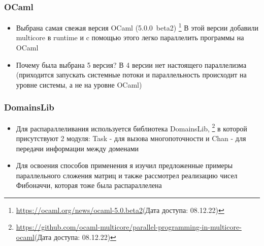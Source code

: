 \documentclass{beamer}
\begin{document}

\begin{frame}
  \frametitle{OCaml}
  \begin{itemize}
  \item Выбрана самая свежая версия OCaml (5.0.0~beta2)
  \footnote{\url{https://ocaml.org/news/ocaml-5.0.beta2}(Дата доступа: 08.12.22)}
  В этой версии добавили multicore в runtime и
  c помощью этого легко параллелить программы на OCaml
  \item Почему была выбрана 5 версия? В 4 версии нет настоящего параллелизма (приходится запускать системные потоки и параллельность происходит на уровне системы, а не на уровне OCaml)
  \end{itemize}
\end{frame}



  
\begin{frame}
  \frametitle{DomainsLib}
  \begin{itemize}
  \item Для распараллеливания используется библиотека DomainsLib,
  \footnote{\url{https://github.com/ocaml-multicore/parallel-programming-in-multicore-ocaml}(Дата доступа: 08.12.22)} 
  в которой присутствуют 2 модуля: Task - для вызова многопоточности и Chan - для передачи информации между доменами
  \item Для освоения способов применения я изучил предложенные примеры параллельного сложения матриц и также рассмотрел реализацию чисел Фибоначчи, которая тоже была распараллелена
  \end{itemize}
\end{frame}
\end{document}
